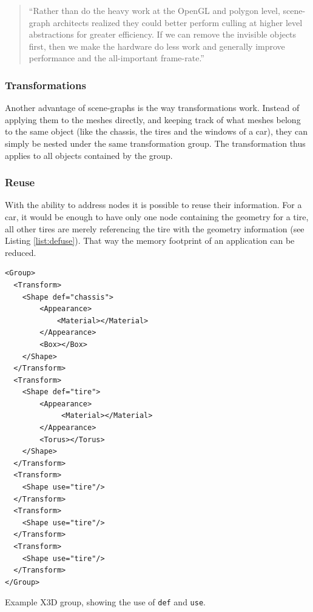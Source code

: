\begin{quote}
  ``Rather than do the heavy work at the \gls{OpenGL} and polygon level,
  scene-graph architects realized they could better perform culling at
  higher level abstractions for greater efficiency. If we can remove the
  invisible objects first, then we make the hardware do less work and
  generally improve performance and the all-important frame-rate.'' \cite{realityprime}
\end{quote}

\subsubsection{Transformations}\label{transformations}

Another advantage of scene-graphs is the way transformations work. Instead of applying
them to the meshes directly, and keeping track of what meshes belong to
the same object (like the chassis, the tires and the windows of a
car), they can simply be nested under the same transformation group. The
transformation thus applies to all objects contained by the group.

\subsubsection{Reuse}\label{reuse}

With the ability to address nodes it is possible to reuse their
information. For a car, it would be enough to have only one node
containing the geometry for a tire, all other tires are merely referencing
the tire with the geometry information (see Listing \ref{list:defuse}).
That way the memory footprint of an application can be reduced.

\begin{listing}
  \begin{verbatim}
<Group>
  <Transform>
    <Shape def="chassis">
        <Appearance>
            <Material></Material>
        </Appearance>
        <Box></Box>
    </Shape>
  </Transform>
  <Transform>
    <Shape def="tire">
        <Appearance>
             <Material></Material>
        </Appearance>
        <Torus></Torus>
    </Shape>
  </Transform>
  <Transform>
    <Shape use="tire"/>
  </Transform>
  <Transform>
    <Shape use="tire"/>
  </Transform>
  <Transform>
    <Shape use="tire"/>
  </Transform>
</Group>
  \end{verbatim}
  \caption{Example \gls{X3D} group, showing the use of \texttt{def} and \texttt{use}.}
  \label{list:defuse}
\end{listing}



